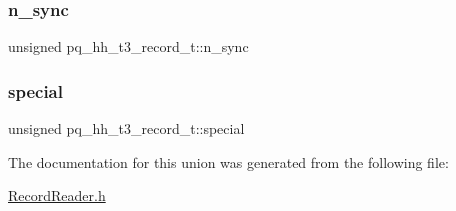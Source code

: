 \subsubsection{\texorpdfstring{n\+\_\+sync}{n\_sync}}
{\footnotesize\ttfamily unsigned pq\+\_\+hh\+\_\+t3\+\_\+record\+\_\+t\+::n\+\_\+sync}

\mbox{\label{unionpq__hh__t3__record__t_ae5a00d94ca6826e4a9825793cd646b7b}} 
\subsubsection{\texorpdfstring{special}{special}}
{\footnotesize\ttfamily unsigned pq\+\_\+hh\+\_\+t3\+\_\+record\+\_\+t\+::special}



The documentation for this union was generated from the following file\+:\begin{DoxyCompactItemize}
\item 
\hyperlink{_record_reader_8h}{Record\+Reader.\+h}\end{DoxyCompactItemize}
